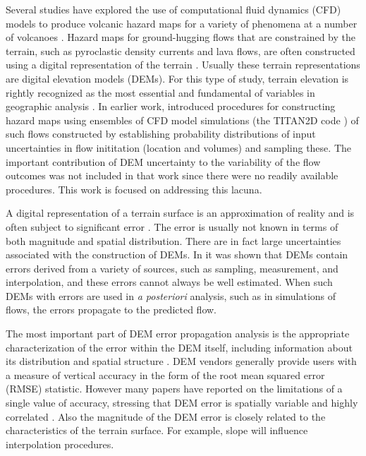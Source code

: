 \documentclass[12pt]{article}
\begin{document}
Several studies have explored the use of computational fluid
dynamics (CFD) models to produce volcanic hazard maps for a variety of
phenomena at a number of volcanoes \citep{Hooper2003, stinton_2006, murcia_2010, Proctor2010, Sheridan2010}.  Hazard maps for ground-hugging flows that are
constrained by the terrain, such as pyroclastic density currents and
lava flows, are often constructed using a digital representation of the
terrain \citep{Takahashi2000, Keith}.  Usually these terrain
representations are digital elevation models (DEMs).  For this type of
study, terrain elevation is rightly recognized as the most essential
and fundamental of variables in geographic analysis
\citep{Mitasova1996, Atkinson2002, Wechsler2006, stefanescu1}. In earlier work, \citep{Keith}  introduced
procedures for constructing hazard maps using ensembles of CFD model simulations
(the TITAN2D code \citep{Patra2005}) of such flows constructed by
establishing probability distributions of input uncertainties in flow
inititation (location and volumes) and sampling these.  The important
contribution of DEM uncertainty to the variability of the flow
outcomes was not included in that work since there were no readily
available procedures. This work is focused on addressing
this lacuna.


A digital representation of a terrain surface is an approximation of
reality and is often subject to significant error \citep{Mitasova1996}. The error is
usually not known in terms of both magnitude and spatial distribution.
There are in fact large uncertainties associated with the construction
of DEMs. In \citep{Wechsler2006} it was shown that DEMs contain errors
derived from a variety of sources, such as sampling, measurement, and
interpolation, and these errors cannot always be well estimated. When
such DEMs with errors are used in {\it a posteriori} analysis, such as in
simulations of flows, the errors propagate to the predicted flow.

The most important part of DEM error propagation analysis is the
appropriate characterization of the error within the DEM itself,
including information about its distribution and spatial structure
\citep{Shortridge2001}.  DEM vendors generally provide users with a
measure of vertical accuracy in the form of the root mean squared
error (RMSE) statistic. However many papers have reported on the
limitations of a single value of accuracy, stressing that DEM error is
spatially variable and highly correlated \citep{Wechsler2006,
  Amii_Darnell}. Also the magnitude of the DEM error is closely
related to the characteristics of the terrain surface. For example,
slope will influence interpolation procedures.
\end{document}

